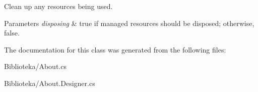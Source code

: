 Clean up any resources being used. 


\begin{DoxyParams}{Parameters}
{\em disposing} & true if managed resources should be disposed; otherwise, false.\\
\hline
\end{DoxyParams}


The documentation for this class was generated from the following files\+:\begin{DoxyCompactItemize}
\item 
Biblioteka/About.\+cs\item 
Biblioteka/About.\+Designer.\+cs\end{DoxyCompactItemize}
